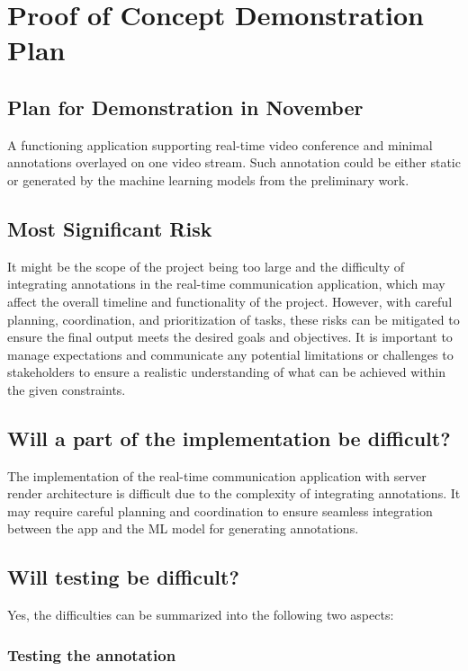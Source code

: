 \documentclass{article}
\begin{document}
\section{Proof of Concept Demonstration Plan}

\subsection{Plan for Demonstration in November}

A functioning application supporting real-time video conference and minimal
annotations overlayed on one video stream. Such annotation could be either
static or generated by the machine learning models from the preliminary work.

\subsection{Most Significant Risk}

It might be the scope of the project being too large and the difficulty of
integrating annotations in the real-time communication application, which may
affect the overall timeline and functionality of the project. However, with
careful planning, coordination, and prioritization of tasks, these risks can be
mitigated to ensure the final output meets the desired goals and objectives. It
is important to manage expectations and communicate any potential limitations or
challenges to stakeholders to ensure a realistic understanding of what can be
achieved within the given constraints.

\subsection{Will a part of the implementation be difficult?}

The implementation of the real-time communication application with server render
architecture is difficult due to the complexity of integrating annotations. It
may require careful planning and coordination to ensure seamless integration
between the app and the ML model for generating annotations.

\subsection{Will testing be difficult?}

Yes, the difficulties can be summarized into the following two aspects:

\subsubsection{Testing the annotation}
\end{document}
